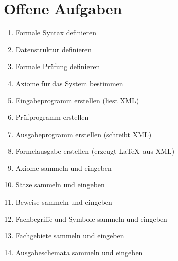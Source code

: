 \documentclass[english,ngerman,parskip=half,headsepline,footsepline]{scrreprt}
\begin{document}
	\section{Offene Aufgaben}
	\begin{enumerate}
		\item Formale Syntax definieren
		\item Datenstruktur definieren
		\item Formale Prüfung definieren
		\item Axiome für das System bestimmen
		\item Eingabeprogramm erstellen (liest XML)
		\item Prüfprogramm erstellen
		\item Ausgabeprogramm erstellen (schreibt XML)
		\item Formelausgabe erstellen (erzeugt \LaTeX\ aus XML)
		\item Axiome sammeln und eingeben
		\item Sätze sammeln und eingeben
		\item Beweise sammeln und eingeben
		\item Fachbegriffe und Symbole sammeln und eingeben
		\item Fachgebiete sammeln und eingeben
		\item Ausgabeschemata sammeln und eingeben
	\end{enumerate}
		

    \newpage
    \begin{minipage}{\textwidth}
    	\listoftables{}
    \end{minipage}
	\thispagestyle{scrheadings}
    \begin{minipage}{\textwidth}
    	\listoffigures{}       
    \end{minipage}
	\thispagestyle{scrheadings}
	
\end{document}
